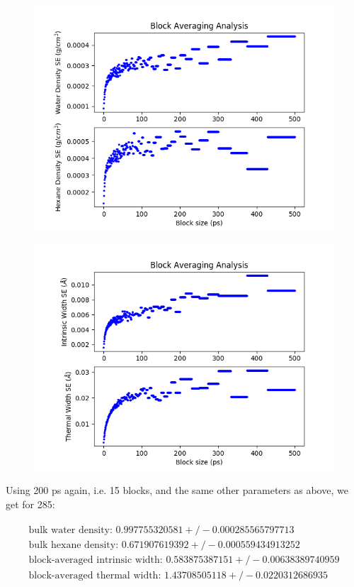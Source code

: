 \documentclass[12pt,reqno]{amsart}
\numberwithin{equation}{section}
\begin{document}
\begin{enumerate}
\begin{figure}[H]
\includegraphics[scale=0.6]{density_profile_block_averaging_1_full-285-1bead}
\end{figure}

\begin{figure}[H]
\centering
\includegraphics[scale=0.6]{density_profile_block_averaging_2_full-285-1bead}
\end{figure}

Using 200 ps again, i.e. 15 blocks, and the same other parameters as above, we get for 285:

\begin{align}
\begin{split}
\text{bulk water density: } 0.997755320581  +/- 0.000285565797713 \\
\text{bulk hexane density: } 0.671907619392  +/- 0.000559434913252 \\
\text{block-averaged intrinsic width: } 0.583875387151  +/- 0.00638389740959\\
\text{block-averaged thermal width: } 1.43708505118  +/- 0.0220312686935 \\
\end{split}
\end{align} 


\end{enumerate}
\end{document}
